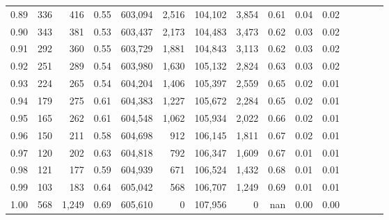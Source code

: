 \begin{tabular}{rrrcrrrrrrrrrrr}
0.89 &     336 &    416 &                                       0.55 &  603,094 &    2,516 &  104,102 &    3,854 &  0.61 &  0.04 &                         0.02 \\
0.90 &     343 &    381 &                                       0.53 &  603,437 &    2,173 &  104,483 &    3,473 &  0.62 &  0.03 &                         0.02 \\
0.91 &     292 &    360 &                                       0.55 &  603,729 &    1,881 &  104,843 &    3,113 &  0.62 &  0.03 &                         0.02 \\
0.92 &     251 &    289 &                                       0.54 &  603,980 &    1,630 &  105,132 &    2,824 &  0.63 &  0.03 &                         0.02 \\
0.93 &     224 &    265 &                                       0.54 &  604,204 &    1,406 &  105,397 &    2,559 &  0.65 &  0.02 &                         0.01 \\
0.94 &     179 &    275 &                                       0.61 &  604,383 &    1,227 &  105,672 &    2,284 &  0.65 &  0.02 &                         0.01 \\
0.95 &     165 &    262 &                                       0.61 &  604,548 &    1,062 &  105,934 &    2,022 &  0.66 &  0.02 &                         0.01 \\
0.96 &     150 &    211 &                                       0.58 &  604,698 &      912 &  106,145 &    1,811 &  0.67 &  0.02 &                         0.01 \\
0.97 &     120 &    202 &                                       0.63 &  604,818 &      792 &  106,347 &    1,609 &  0.67 &  0.01 &                         0.01 \\
0.98 &     121 &    177 &                                       0.59 &  604,939 &      671 &  106,524 &    1,432 &  0.68 &  0.01 &                         0.01 \\
0.99 &     103 &    183 &                                       0.64 &  605,042 &      568 &  106,707 &    1,249 &  0.69 &  0.01 &                         0.01 \\
1.00 &     568 &  1,249 &                                       0.69 &  605,610 &        0 &  107,956 &        0 &   nan &  0.00 &                         0.00 \\
\bottomrule
\end{tabular}
